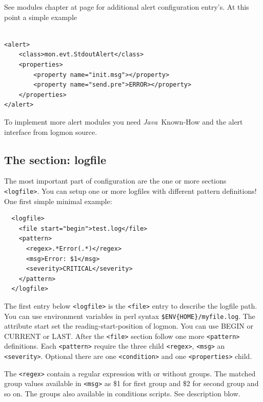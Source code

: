 \documentclass[11pt,a4paper]{article}
\newcommand{\java}{\textit{Java\ }}
\begin{document}
See modules chapter at page \pageref{sec:modules} for additional alert
configuration entry's. At this point a simple example

\begin{samepage}
\begin{verbatim}

<alert>
    <class>mon.evt.StdoutAlert</class>
    <properties>
        <property name="init.msg"></property>
        <property name="send.pre">ERROR></property>
    </properties>
</alert>

\end{verbatim}
\end{samepage}

To implement more alert modules you need \java Known-How and the alert interface
from logmon source.

\subsection{The section: logfile}

The most important part of configuration are the one or more sections \verb#<logfile>#. You can
setup one or more logfiles with different pattern definitions! One first simple minimal example:

\begin{samepage}
\label{ex:logfile1}
\begin{verbatim}
  <logfile>
    <file start="begin">test.log</file>
    <pattern>
      <regex>.*Error(.*)</regex>
      <msg>Error: $1</msg>
      <severity>CRITICAL</severity>
    </pattern>
  </logfile>
\end{verbatim}
\end{samepage}

The first entry below \verb#<logfile># is the \verb#<file># entry to describe
the logfile path. You can use environment variables in perl syntax
\verb#$ENV{HOME}/myfile.log#. The attribute start set the reading-start-position
of logmon. You can use BEGIN or CURRENT or LAST.
After the \verb#<file># section
follow one more \verb#<pattern># definitions. Each \verb#<pattern># require the
three child \verb#<regex>#, \verb#<msg># an \verb#<severity>#. Optional there
are one \verb#<condition># and one \verb#<properties># child.

The \verb#<regex># contain a regular expression with or without groups. The
matched group values available in \verb#<msg># as \$1 for first group and \$2
for second group and so on. The groups also available in conditions scripts. See
description blow.
\end{document}

